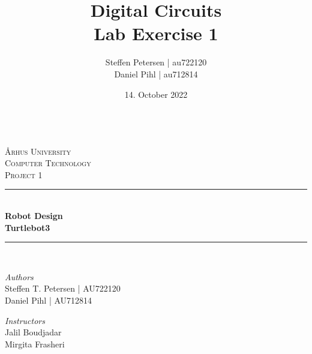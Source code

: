 \documentclass{article}
\title{\Huge Digital Circuits\\\LARGE Lab Exercise 1}
\author{Steffen Petersen | au722120 \\ Daniel Pihl | au712814}
\date{14. October 2022}
\begin{document}

\begin{titlepage} %
  \newcommand{\HRule}{\rule{\linewidth}{0.5mm}} %

    \center %
    
    \textbf{\space}\\[2cm]   
    \textsc{\LARGE Århus University}\\[1.5cm] %
    
    \textsc{\Large Computer Technology}\\[0.5cm] %
    
    \textsc{\large Project 1}\\[0.5cm] %
    
    
    \HRule\\[0cm]
    
    {\huge\bfseries Robot Design\\[0.1cm]}
    {\large\bfseries Turtlebot3\\}
    
    \HRule\\[1.5cm]
    
    
    \begin{minipage}{0.4\textwidth}
      \begin{flushleft}
        \large
        \textit{Authors}\\
        Steffen T. Petersen | AU722120\\
        Daniel Pihl | AU712814
      \end{flushleft}
    \end{minipage}
    \begin{minipage}{0.4\textwidth}
      \begin{flushright}
        \large\vspace{-4mm}
        \textit{Instructors}\\
        Jalil Boudjadar\\
        Mirgita Frasheri
      \end{flushright}
    \end{minipage}
    

\end{titlepage}
\end{document}
